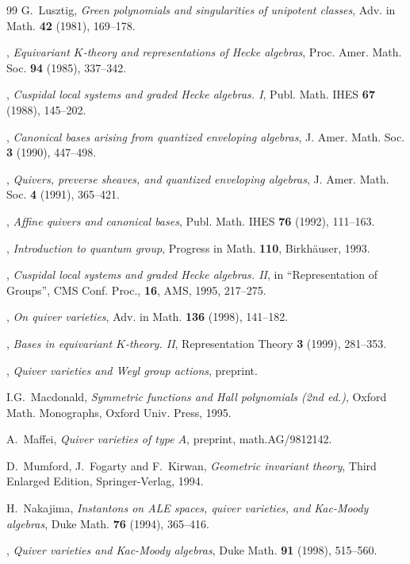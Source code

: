 \documentclass[12pt]{amsart}
\theoremstyle{definition}
\theoremstyle{remark}
\numberwithin{equation}{subsection}
\begin{document}
\begin{thebibliography}{99}
 G.~Lusztig,
{\it Green polynomials and singularities of unipotent classes},
Adv. in Math. {\bf 42} (1981), 169--178.

 \bysame,
{\it Equivariant $K$-theory and representations of Hecke algebras},
Proc. Amer. Math. Soc. {\bf 94} (1985), 337--342.

 \bysame,
{\it Cuspidal local systems and graded Hecke algebras. I},
Publ. Math. IHES {\bf 67} (1988), 145--202.

 \bysame,
 {\it Canonical bases arising from quantized enveloping algebras},
 J. Amer. Math. Soc. {\bf 3} (1990), 447--498.

 \bysame,
{\it Quivers, preverse sheaves, and quantized enveloping algebras},
 J. Amer. Math. Soc. {\bf 4} (1991), 365--421.

 \bysame,
 {\it Affine quivers and canonical bases},
 Publ. Math. IHES {\bf 76} (1992), 111--163.

 \bysame,
{\it Introduction to quantum group},
Progress in Math. {\bf 110}, Birkh\"auser, 1993.

 \bysame,
{\it Cuspidal local systems and graded Hecke algebras. II},
in ``Representation of Groups'', CMS Conf. Proc., {\bf 16}, AMS, 1995,
217--275.

 \bysame,
{\it On quiver varieties},
Adv. in Math. {\bf 136} (1998), 141--182.

 \bysame,
{\it Bases in equivariant $K$-theory. II},
Representation Theory {\bf 3} (1999), 281--353.

 \bysame,
{\it Quiver varieties and Weyl group actions},
preprint.

 I.G.~Macdonald,
{\it Symmetric functions and Hall polynomials (2nd ed.)},
Oxford Math. Monographs, Oxford Univ. Press, 1995.

 A.~Maffei,
{\it Quiver varieties of type $A$},
preprint, math.AG/9812142.

 D.~Mumford, J.~Fogarty and F.~Kirwan,
{\it Geometric invariant theory}, Third Enlarged Edition, 
Springer-Verlag, 1994.

 H.~Nakajima,
 {\it Instantons on ALE spaces, quiver varieties, and Kac-Moody
   algebras},
 Duke Math. {\bf 76} (1994), 365--416.

 \bysame,
{\it Quiver varieties and Kac-Moody algebras},
Duke Math. {\bf 91} (1998), 515--560.


\end{thebibliography}
\end{document}
